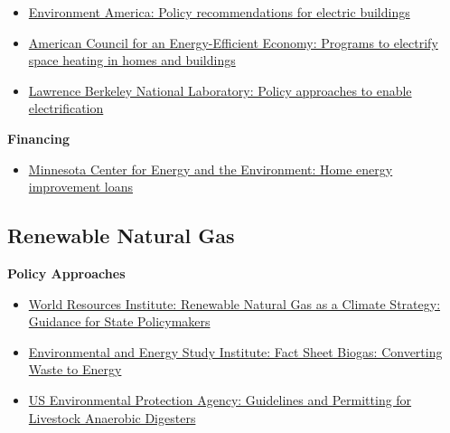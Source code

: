 \documentclass[
]{book}
\providecommand{\tightlist}{%
  \setlength{\itemsep}{0pt}\setlength{\parskip}{0pt}}
\begin{document}
\begin{itemize}
\tightlist
\item
  \href{https://environmentamerica.org/sites/environment/files/reports/Electric-Buildings-2021/National-Electric-Buildings-Web.pdf?_ga=2.10624308.1239172724.1638808751-1075536878.1638808751\#page=32}{Environment America: Policy recommendations for electric buildings}
\item
  \href{https://www.aceee.org/sites/default/files/pdfs/programs_to_electrify_space_heating_brief_final_6-23-20.pdf}{American Council for an Energy-Efficient Economy: Programs to electrify space heating in homes and buildings}
\item
  \href{https://ipu.msu.edu/wp-content/uploads/2018/04/LBNL-Electrification-of-Buildings-2018.pdf\#page=47}{Lawrence Berkeley National Laboratory: Policy approaches to enable electrification}
\end{itemize}

\textbf{Financing}

\begin{itemize}
\tightlist
\item
  \href{https://www.mncee.org/residential-statewide-lending}{Minnesota Center for Energy and the Environment: Home energy improvement loans}
\end{itemize}

\hypertarget{renewable-natural-gas-2}{%
\subsection{Renewable Natural Gas}\label{renewable-natural-gas-2}}

\textbf{Policy Approaches}

\begin{itemize}
\tightlist
\item
  \href{https://www.wri.org/research/renewable-natural-gas-climate-strategy-guidance-state-policymakers}{World Resources Institute: Renewable Natural Gas as a Climate Strategy: Guidance for State Policymakers}
\item
  \href{https://www.eesi.org/papers/view/fact-sheet-biogasconverting-waste-to-energy}{Environmental and Energy Study Institute: Fact Sheet \textbar{} Biogas: Converting Waste to Energy}
\item
  \href{https://www.epa.gov/agstar/guidelines-and-permitting-livestock-anaerobic-digesters}{US Environmental Protection Agency: Guidelines and Permitting for Livestock Anaerobic Digesters}
\end{itemize}
\end{document}

